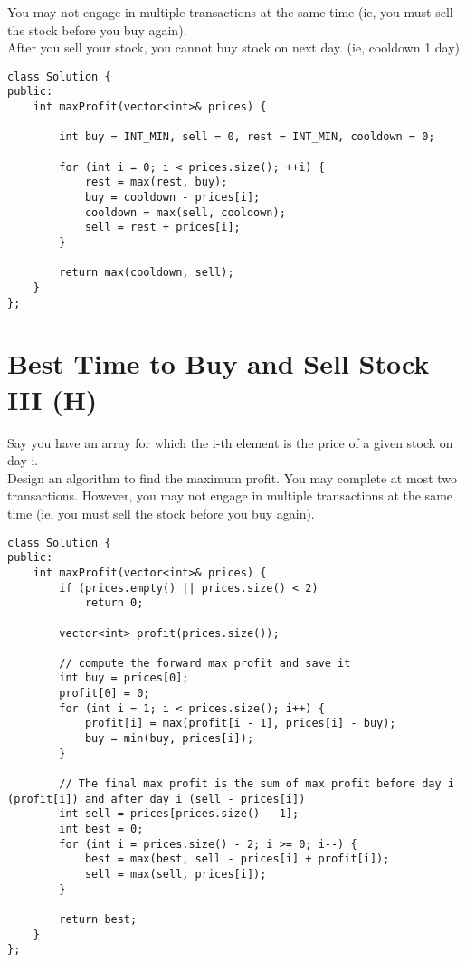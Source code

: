     You may not engage in multiple transactions at the same time (ie, you must sell the stock before you buy again).\\
    After you sell your stock, you cannot buy stock on next day. (ie, cooldown 1 day)\\


\begin{lstlisting}
class Solution {
public:
    int maxProfit(vector<int>& prices) {

        int buy = INT_MIN, sell = 0, rest = INT_MIN, cooldown = 0;
        
        for (int i = 0; i < prices.size(); ++i) {
            rest = max(rest, buy);
            buy = cooldown - prices[i];
            cooldown = max(sell, cooldown);
            sell = rest + prices[i];
        }
        
        return max(cooldown, sell);
    }
};
\end{lstlisting}


\section{Best Time to Buy and Sell Stock III (H)}
Say you have an array for which the i-th element is the price of a given stock on day i. \\

Design an algorithm to find the maximum profit. You may complete at most two transactions. However, you may not engage in multiple transactions at the same time (ie, you must sell the stock before you buy again). \\

\begin{lstlisting}
class Solution {
public:
    int maxProfit(vector<int>& prices) {
        if (prices.empty() || prices.size() < 2)
            return 0;
        
        vector<int> profit(prices.size());
        
        // compute the forward max profit and save it
        int buy = prices[0];
        profit[0] = 0;
        for (int i = 1; i < prices.size(); i++) {
            profit[i] = max(profit[i - 1], prices[i] - buy);
            buy = min(buy, prices[i]);
        }
        
        // The final max profit is the sum of max profit before day i (profit[i]) and after day i (sell - prices[i])
        int sell = prices[prices.size() - 1];
        int best = 0;
        for (int i = prices.size() - 2; i >= 0; i--) {
            best = max(best, sell - prices[i] + profit[i]);
            sell = max(sell, prices[i]);
        }
        
        return best;   
    }
};
\end{lstlisting}


